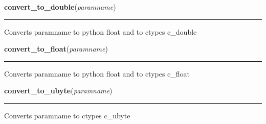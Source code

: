     \label{xformslib:library:convert_to_double}

    \vspace{0.5ex}

\hspace{.8\funcindent}\begin{boxedminipage}{\funcwidth}

    \raggedright \textbf{convert\_to\_double}(\textit{paramname})

    \vspace{-1.5ex}

    \rule{\textwidth}{0.5\fboxrule}
\setlength{\parskip}{2ex}
    Converts paramname to python float and to ctypes c\_double

\setlength{\parskip}{1ex}
    \end{boxedminipage}

    \label{xformslib:library:convert_to_float}

    \vspace{0.5ex}

\hspace{.8\funcindent}\begin{boxedminipage}{\funcwidth}

    \raggedright \textbf{convert\_to\_float}(\textit{paramname})

    \vspace{-1.5ex}

    \rule{\textwidth}{0.5\fboxrule}
\setlength{\parskip}{2ex}
    Converts paramname to python float and to ctypes c\_float

\setlength{\parskip}{1ex}
    \end{boxedminipage}

    \label{xformslib:library:convert_to_ubyte}

    \vspace{0.5ex}

\hspace{.8\funcindent}\begin{boxedminipage}{\funcwidth}

    \raggedright \textbf{convert\_to\_ubyte}(\textit{paramname})

    \vspace{-1.5ex}

    \rule{\textwidth}{0.5\fboxrule}
\setlength{\parskip}{2ex}
    Converts paramname to ctypes c\_ubyte

\setlength{\parskip}{1ex}
    \end{boxedminipage}

